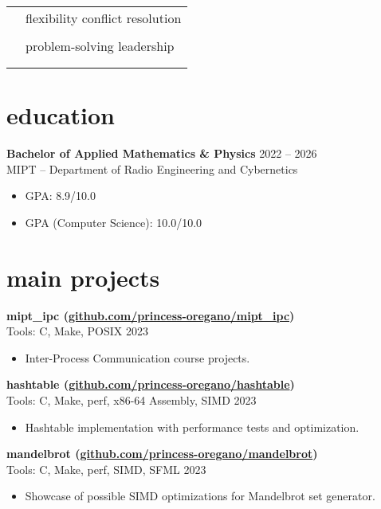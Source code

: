 \documentclass[12pt]{article}
\newcommand{\entry}[4]{{{\textbf{#1}}} \hfill #3 \\ #2 \hfill #4}
\newcommand{\tableentry}[3]{\textsc{#1} & #2\expandafter\ifstrequal\expandafter{#3}{}{\\}{\\[6pt]}}
\begin{document}
\begin{paracol}{2}
\begin{supertabular}{rl}
			\tableentry{\footnotesize\faComments}{flexibility \textperiodcentered{} conflict resolution}{}
			\tableentry{}{problem-solving \textperiodcentered{} leadership}{}
		\end{supertabular}
		
		\switchcolumn
		
		\section{education}
		
		\entry{Bachelor of Applied Mathematics \& Physics}{MIPT -- Department of Radio Engineering and Cybernetics}{2022 -- 2026}{     }
		\begin{itemize}[noitemsep,leftmargin=3.5mm,rightmargin=0mm,topsep=6pt]
			\item GPA: 8.9/10.0
			\item GPA (Computer Science): 10.0/10.0
		\end{itemize}
		
		\section{main projects}
		
		\medskip

				
		\entry{mipt\_ipc \normalfont \footnotesize{(\href{https://github.com/princess-oregano/mipt_ipc}{github.com/princess-oregano/mipt\_ipc})}}{Tools: C, Make, POSIX}{ }{2023}
		\begin{itemize}[noitemsep,leftmargin=3.5mm,rightmargin=0mm,topsep=6pt]
			\item Inter-Process Communication course projects.  
		\end{itemize}

		\entry{hashtable \normalfont \footnotesize{(\href{https://github.com/princess-oregano/hashtable}{github.com/princess-oregano/hashtable})}}{Tools: C, Make, perf, x86-64 Assembly, SIMD}{ }{2023}
		\begin{itemize}[noitemsep,leftmargin=3.5mm,rightmargin=0mm,topsep=6pt]
			\item Hashtable implementation with performance tests and optimization.
		\end{itemize}

		
		\entry{mandelbrot \normalfont \footnotesize{(\href{https://github.com/princess-oregano/mandelbrot}{github.com/princess-oregano/mandelbrot})}}{Tools: C, Make, perf, SIMD, SFML}{ }{2023}
		\begin{itemize}[noitemsep,leftmargin=3.5mm,rightmargin=0mm,topsep=6pt]
			\item Showcase of possible SIMD optimizations for Mandelbrot set
			generator.
		\end{itemize}
				

\end{paracol}
\end{document}
